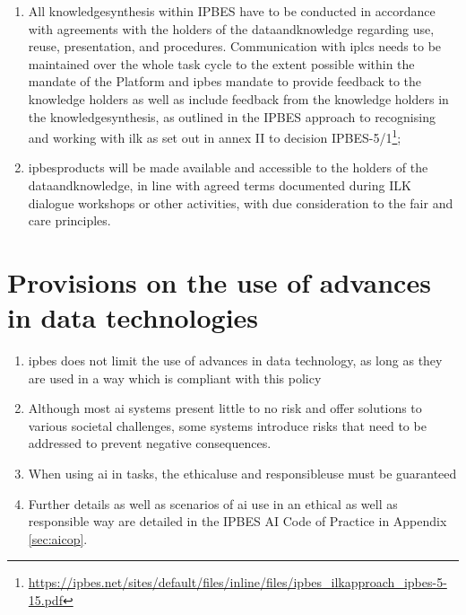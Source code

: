 \documentclass{article}
\begin{document}
\begin{enumerate}[label=(\alph*)]
    \item All \gls{knowledgesynthesis} within IPBES have to be conducted in accordance with agreements with the holders of the \gls{dataandknowledge} regarding use, reuse, presentation, and procedures. Communication with \glspl{iplc} needs to be maintained over the whole \gls{task} cycle to the extent possible within the mandate of the Platform and \gls{ipbes} mandate to provide feedback to the \gls{knowledge} holders as well as include feedback from the \gls{knowledge} holders in the \gls{knowledgesynthesis}, as outlined in the IPBES approach to recognising and working with \gls{ilk} as set out in annex II to decision IPBES-5/1\footnote{\href{https://ipbes.net/sites/default/files/inline/files/ipbes_ilkapproach_ipbes-5-15.pdf}{https://ipbes.net/sites/default/files/inline/files/ipbes\_ilkapproach\_ipbes-5-15.pdf}};

    \item \glspl{ipbesproduct} will be made available and \gls{accessible} to the holders of the \gls{dataandknowledge}, in line with agreed terms documented during ILK dialogue workshops or other activities, with due consideration to the \gls{fair} and \gls{care} principles.
\end{enumerate}

\section{Provisions on the use of advances in data technologies}
\begin{enumerate}[label=(\alph*)]
    \item \gls{ipbes} does not limit the use of advances in data technology, as long as they are used in a way which is compliant with this policy
    \item Although most \gls{ai} systems present little to no risk and offer solutions to various societal challenges, some systems introduce risks that need to be addressed to prevent negative consequences.
    \item When using \gls{ai} in \glspl{task}, the \gls{ethicaluse} and \gls{responsibleuse} must be guaranteed
    \item Further details as well as scenarios of \gls{ai} use in an ethical as well as responsible way are detailed in the IPBES AI Code of Practice in Appendix \ref{sec:aicop}.
\end{enumerate}




\appendix
\end{document}

